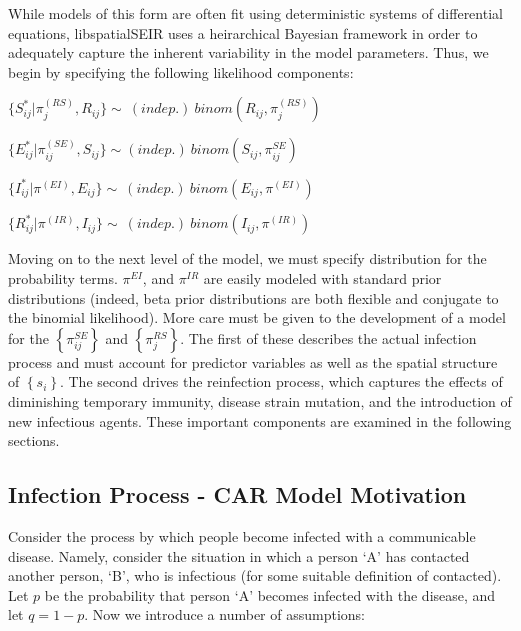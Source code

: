 \documentclass[12pt]{article}
\newcommand \noi {\noindent}
\newcommand \mbreak {\\ \vspace{0.1in}}
\begin{document}
    While models of this form are often fit using deterministic systems of differential equations, libspatialSEIR uses
    a heirarchical Bayesian framework in order to adequately capture the inherent variability in the model parameters.
    Thus, we begin by specifying the following likelihood components:\\

    \vspace{0.15in}

        \noi

        $\{S_{ij}^* | \pi_j^{(RS)}, R_{ij}\} \sim\ (indep.)\  binom(R_{ij}, \pi_j^{(RS)})$\mbreak

        $\{E_{ij}^* | \pi^{(SE)}_{ij}, S_{ij} \} \sim (indep.)\ binom(S_{ij}, \pi^{SE}_{ij})$ \mbreak

        $\{I_{ij}^* | \pi^{(EI)}, E_{ij} \} \sim\ (indep.)\ binom(E_{ij}, \pi^{(EI)})$\mbreak

        $\{R_{ij}^* | \pi^{(IR)}, I_{ij}\} \sim\ (indep.)\ binom(I_{ij}, \pi^{(IR)})$\mbreak


        Moving on to the next level of the model, we must specify distribution for the probability terms. $\pi^{EI}$, and $\pi^{IR}$ are easily modeled with standard prior distributions (indeed, beta prior distributions are both flexible and conjugate to the binomial likelihood).  
More care must be given to the development of a model for the $\left\{\pi^{SE}_{ij} \right\}$ and $\left\{\pi^{RS}_j \right\}$. The first of
these describes the actual infection process and must account for predictor variables as well as the 
spatial structure of $\left\{ s_i \right\}$. The second drives the reinfection process, which captures the effects of diminishing temporary immunity, 
disease strain mutation, and the introduction of new infectious agents. These important components are examined in the following sections. 


\subsection{Infection Process - CAR Model Motivation}

Consider the process by which people become infected with a communicable disease. 
Namely, consider the situation in which a person `A' has contacted another person, `B', 
who is infectious (for some suitable definition of contacted). 
Let $p$ be the probability that person `A' becomes infected with the disease, and
let $q=1-p$. Now we introduce a number of assumptions:
\end{document}
